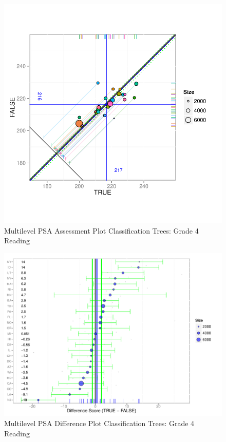 \documentclass[letterpaper,12p,twoside]{article} %
\begin{document}
\begin{figure}[h!]
\begin{center}
\includegraphics[width=\textwidth]{../Figures2009/g4read-mlpsa-ctree-circ.pdf}
\caption{Multilevel PSA Assessment Plot Classification Trees: Grade 4 Reading}
\end{center}
\end{figure}

\begin{figure}[h!]
\begin{center}
\includegraphics[width=\textwidth]{../Figures2009/g4read-mlpsa-ctree-diff.pdf}
\caption{Multilevel PSA Difference Plot Classification Trees: Grade 4 Reading}
\end{center}
\end{figure}
\end{document}
